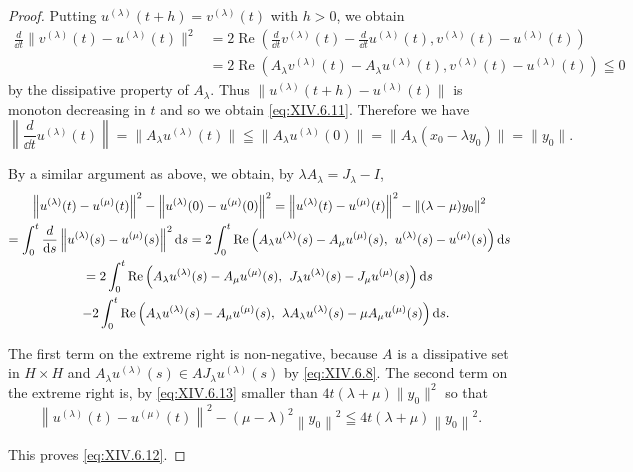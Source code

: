 \begin{proof}
 Putting $u^{(\lambda)}(t + h) = v^{(\lambda)}(t)$ with $h > 0$, we obtain 
\[
\begin{aligned} \frac {d}{\dd t} \| v ^{(\lambda)} (t) - u ^{(\lambda)} (t) \| ^{2} & = 2 \operatorname{Re} \left(\frac {d}{\dd t} v ^{(\lambda)} (t) - \frac {d}{\dd t} u ^{(\lambda)} (t), v ^{(\lambda)} (t) - u ^{(\lambda)} (t)\right) \\ & = 2 \operatorname{Re} \left(A _{\lambda} v ^{(\lambda)} (t) - A _{\lambda} u ^{(\lambda)} (t), v ^{(\lambda)} (t) - u ^{(\lambda)} (t)\right) \leqq 0 \end{aligned}
\]
by the dissipative property of $A_{\lambda}$. Thus $\|u^{(\lambda)}(t + h) - u^{(\lambda)}(t)\|$ is monoton decreasing in $t$ and so we obtain \eqref{eq:XIV.6.11}. Therefore we have 
\begin{equation}\label{eq:XIV.6.13}
\left\| \frac {d}{\dd t} u ^{(\lambda)} (t) \right\| = \| A _{\lambda} u ^{(\lambda)} (t) \| \leqq \| A _{\lambda} u ^{(\lambda)} (0) \| = \| A _{\lambda} (x _{0} - \lambda y _{0}) \| = \| y _{0} \|. \end{equation}

By a similar argument as above, we obtain, by $\lambda A_{\lambda} = J_{\lambda} - I$, 
\begin{gather}\left\| u ^{(\lambda)} (t) - u ^{(\mu)} (t) \right\| ^{2} - \left\| u ^{(\lambda)} (0) - u ^{(\mu)} (0) \right\| ^{2} = \left\| u ^{(\lambda)} (t) - u ^{(\mu)} (t) \right\| ^{2} - \left\| (\lambda - \mu) y _{0} \right\| ^{2} \notag
\\= \int_{0} ^{t} \frac {d}{\mathop{}\!\mathrm{d} s} \left\| u ^{(\lambda)} (s) - u ^{(\mu)} (s) \right\| ^{2} \mathop{}\!\mathrm{d} s = 2 \int_{0} ^{t} \operatorname{Re} \left(A _{\lambda} u ^{(\lambda)} (s) - A _{\mu} u ^{(\mu)} (s), \right. \left. u ^{(\lambda)} (s) - u ^{(\mu)} (s)\right) \mathop{}\!\mathrm{d} s \notag
\\= 2 \int_{0} ^{t} \operatorname{Re} \left(A _{\lambda} u ^{(\lambda)} (s) - A _{\mu} u ^{(\mu)} (s), \right. \left. J _{\lambda} u ^{(\lambda)} (s) - J _{\mu} u ^{(\mu)} (s)\right) \mathop{}\!\mathrm{d} s \notag
\\\quad - 2 \int_{0} ^{t} \operatorname{Re} \left(A _{\lambda} u ^{(\lambda)} (s) - A _{\mu} u ^{(\mu)} (s), \right. \left. \lambda A _{\lambda} u ^{(\lambda)} (s) - \mu A _{\mu} u ^{(\mu)} (s)\right) \mathop{}\!\mathrm{d} s. \notag
\end{gather}

The first term on the extreme right is non-negative, because $A$ is a dissipative set in $H \times H$ and $A_{\lambda}u^{(\lambda)}(s) \in A J_{\lambda}u^{(\lambda)}(s)$ by \eqref{eq:XIV.6.8}. The second term on the extreme right is, by \eqref{eq:XIV.6.13} smaller than $4t(\lambda + \mu)\|y_{0}\|^{2}$ so that 
\[
\left\| u ^{(\lambda)} (t) - u ^{(\mu)} (t) \right\| ^{2} - (\mu - \lambda) ^{2} \left\| y _{0} \right\| ^{2} \leqq 4 t (\lambda + \mu) \left\| y _{0} \right\| ^{2}.
\]

This proves \eqref{eq:XIV.6.12}. 
\end{proof}

